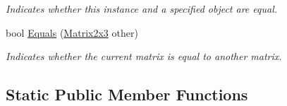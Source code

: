 \begin{DoxyCompactItemize}
\begin{DoxyCompactList}\small\item\em Indicates whether this instance and a specified object are equal. \end{DoxyCompactList}\item 
bool \hyperlink{struct_open_t_k_1_1_matrix2x3_aa96c1b223d4a7af4d9ca9e68daf23b7e}{Equals} (\hyperlink{struct_open_t_k_1_1_matrix2x3}{Matrix2x3} other)
\begin{DoxyCompactList}\small\item\em Indicates whether the current matrix is equal to another matrix. \end{DoxyCompactList}\end{DoxyCompactItemize}
\subsection*{Static Public Member Functions}
